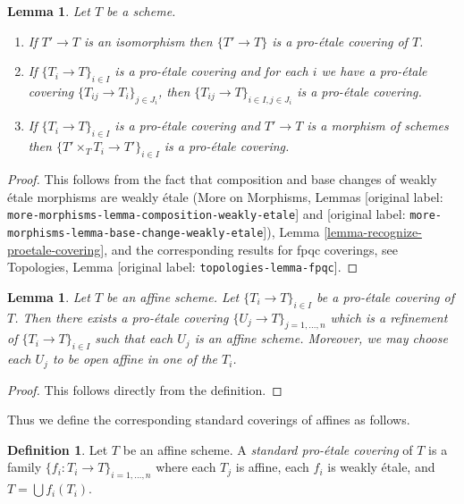 \documentclass[10pt,a4paper]{article}
\theoremstyle{plain}
\newtheorem{lemma}[subsection]{Lemma}
\theoremstyle{definition}
\newtheorem{definition}[subsection]{Definition}
\theoremstyle{remark}
\numberwithin{equation}{subsection}
\begin{document}
\begin{lemma}
\label{lemma-proetale}
Let $T$ be a scheme.
\begin{enumerate}
\item If $T' \to T$ is an isomorphism then $\{T' \to T\}$
is a pro-\'etale covering of $T$.
\item If $\{T_i \to T\}_{i\in I}$ is a pro-\'etale covering and for each
$i$ we have a pro-\'etale covering $\{T_{ij} \to T_i\}_{j\in J_i}$, then
$\{T_{ij} \to T\}_{i \in I, j\in J_i}$ is a pro-\'etale covering.
\item If $\{T_i \to T\}_{i\in I}$ is a pro-\'etale covering
and $T' \to T$ is a morphism of schemes then
$\{T' \times_T T_i \to T'\}_{i\in I}$ is a pro-\'etale covering.
\end{enumerate}
\end{lemma}

\begin{proof}
This follows from the fact that composition and base changes
of weakly \'etale morphisms are weakly \'etale
(More on Morphisms, Lemmas
\textnormal{[original label: \nolinkurl{more-morphisms-lemma-composition-weakly-etale}]} and
\textnormal{[original label: \nolinkurl{more-morphisms-lemma-base-change-weakly-etale}]}),
Lemma \ref{lemma-recognize-proetale-covering}, and
the corresponding results for fpqc coverings, see
Topologies, Lemma \textnormal{[original label: \nolinkurl{topologies-lemma-fpqc}]}.
\end{proof}

\begin{lemma}
\label{lemma-proetale-affine}
Let $T$ be an affine scheme. Let $\{T_i \to T\}_{i \in I}$ be a pro-\'etale
covering of $T$. Then there exists a pro-\'etale covering
$\{U_j \to T\}_{j = 1, \ldots, n}$ which is a refinement
of $\{T_i \to T\}_{i \in I}$ such that each $U_j$ is an affine
scheme. Moreover, we may choose each $U_j$ to be open affine
in one of the $T_i$.
\end{lemma}

\begin{proof}
This follows directly from the definition.
\end{proof}

\noindent
Thus we define the corresponding standard coverings of affines as follows.

\begin{definition}
\label{definition-standard-proetale}
Let $T$ be an affine scheme. A {\it standard pro-\'etale covering}
of $T$ is a family $\{f_i : T_i \to T\}_{i = 1, \ldots, n}$
where each $T_j$ is affine, each $f_i$ is weakly \'etale, and
$T = \bigcup f_i(T_i)$.
\end{definition}
\end{document}
